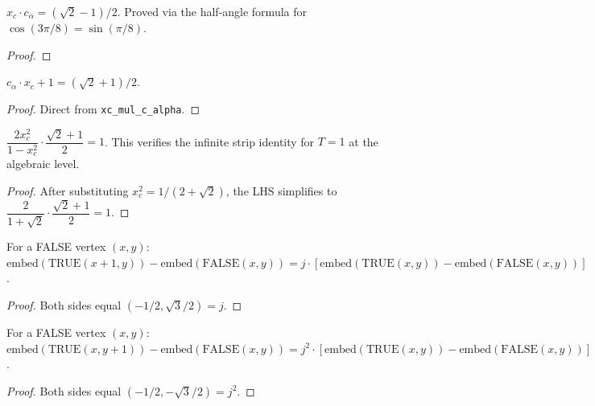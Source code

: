 \begin{lemma}
\begin{lemma}[$x_c \cdot c_\alpha = (\sqrt{2}-1)/2$]\label{lem:xc_calpha}
\leanok
{}
  $x_c \cdot c_\alpha = (\sqrt{2} - 1)/2$.
  Proved via the half-angle formula for $\cos(3\pi/8) = \sin(\pi/8)$.
\end{lemma}
\begin{proof}\leanok\end{proof}

\begin{lemma}[$c_\alpha x_c + 1 = (\sqrt{2}+1)/2$]\label{lem:calpha_xc_plus1}
\leanok
{}
  $c_\alpha \cdot x_c + 1 = (\sqrt{2}+1)/2$.
\end{lemma}
\begin{proof}\leanok Direct from \texttt{xc\_mul\_c\_alpha}.\end{proof}

\begin{lemma}[Strip $T{=}1$ algebraic identity]\label{lem:strip_T1_alg}
\leanok
{}
  $\dfrac{2x_c^2}{1 - x_c^2} \cdot \dfrac{\sqrt{2}+1}{2} = 1$.
  This verifies the infinite strip identity for $T = 1$ at the algebraic level.
\end{lemma}
\begin{proof}\leanok
  After substituting $x_c^2 = 1/(2+\sqrt{2})$, the LHS simplifies to
  $\dfrac{2}{1+\sqrt{2}} \cdot \dfrac{\sqrt{2}+1}{2} = 1$.
\end{proof}

\begin{lemma}[Direction ratio $= j$ (FALSE vertex)]\label{lem:dir_ratio_j_false}
\leanok
{}
  For a FALSE vertex $(x,y)$:
  $\mathrm{embed}(\mathrm{TRUE}(x{+}1,y)) - \mathrm{embed}(\mathrm{FALSE}(x,y))
   = j \cdot [\mathrm{embed}(\mathrm{TRUE}(x,y)) - \mathrm{embed}(\mathrm{FALSE}(x,y))]$.
\end{lemma}
\begin{proof}\leanok Both sides equal $(-1/2, \sqrt{3}/2) = j$.\end{proof}

\begin{lemma}[Direction ratio $= j^2$ (FALSE vertex)]\label{lem:dir_ratio_jsq_false}
\leanok
{}
  For a FALSE vertex $(x,y)$:
  $\mathrm{embed}(\mathrm{TRUE}(x,y{+}1)) - \mathrm{embed}(\mathrm{FALSE}(x,y))
   = j^2 \cdot [\mathrm{embed}(\mathrm{TRUE}(x,y)) - \mathrm{embed}(\mathrm{FALSE}(x,y))]$.
\end{lemma}
\begin{proof}\leanok Both sides equal $(-1/2, -\sqrt{3}/2) = j^2$.\end{proof}


\end{lemma}
